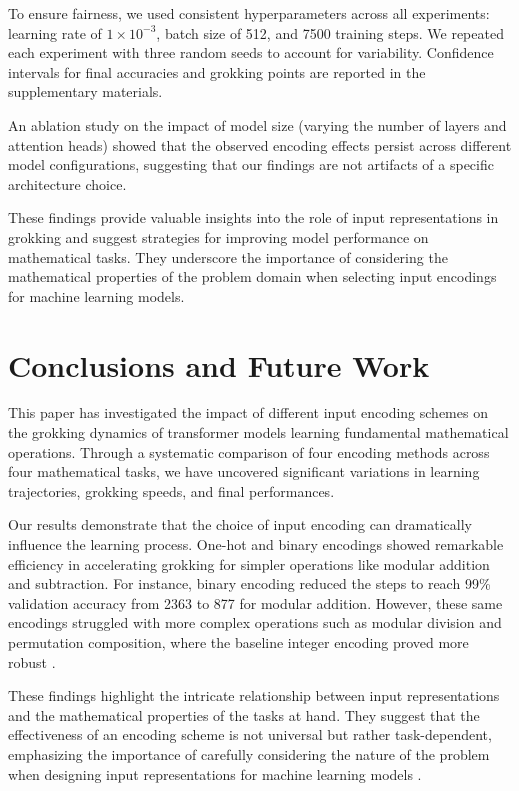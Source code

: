 \documentclass{article} %
\begin{document}
To ensure fairness, we used consistent hyperparameters across all experiments: learning rate of $1 \times 10^{-3}$, batch size of 512, and 7500 training steps. We repeated each experiment with three random seeds to account for variability. Confidence intervals for final accuracies and grokking points are reported in the supplementary materials.

An ablation study on the impact of model size (varying the number of layers and attention heads) showed that the observed encoding effects persist across different model configurations, suggesting that our findings are not artifacts of a specific architecture choice.

These findings provide valuable insights into the role of input representations in grokking and suggest strategies for improving model performance on mathematical tasks. They underscore the importance of considering the mathematical properties of the problem domain when selecting input encodings for machine learning models.

\section{Conclusions and Future Work}
\label{sec:conclusion}

This paper has investigated the impact of different input encoding schemes on the grokking dynamics of transformer models learning fundamental mathematical operations. Through a systematic comparison of four encoding methods across four mathematical tasks, we have uncovered significant variations in learning trajectories, grokking speeds, and final performances.

Our results demonstrate that the choice of input encoding can dramatically influence the learning process. One-hot and binary encodings showed remarkable efficiency in accelerating grokking for simpler operations like modular addition and subtraction. For instance, binary encoding reduced the steps to reach 99\% validation accuracy from 2363 to 877 for modular addition. However, these same encodings struggled with more complex operations such as modular division and permutation composition, where the baseline integer encoding proved more robust \cite{power2022grokking}.

These findings highlight the intricate relationship between input representations and the mathematical properties of the tasks at hand. They suggest that the effectiveness of an encoding scheme is not universal but rather task-dependent, emphasizing the importance of carefully considering the nature of the problem when designing input representations for machine learning models \cite{goodfellow2016deep}.
\end{document}
